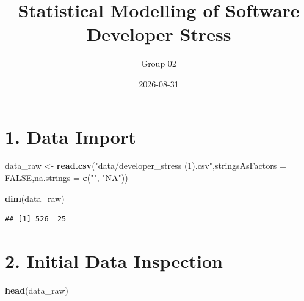 \documentclass[
]{article}
\title{Statistical Modelling of Software Developer Stress}
\author{Group 02}
\date{2026-08-31}
\newenvironment{Shaded}{\begin{snugshade}}{\end{snugshade}}
\newcommand{\AttributeTok}[1]{\textcolor[rgb]{0.13,0.29,0.53}{#1}}
\newcommand{\ConstantTok}[1]{\textcolor[rgb]{0.56,0.35,0.01}{#1}}
\newcommand{\FunctionTok}[1]{\textcolor[rgb]{0.13,0.29,0.53}{\textbf{#1}}}
\newcommand{\NormalTok}[1]{#1}
\newcommand{\OtherTok}[1]{\textcolor[rgb]{0.56,0.35,0.01}{#1}}
\newcommand{\StringTok}[1]{\textcolor[rgb]{0.31,0.60,0.02}{#1}}
\begin{document}
\maketitle

\section{1. Data Import}\label{data-import}

\begin{Shaded}
\begin{Highlighting}[]
\NormalTok{data\_raw }\OtherTok{\textless{}{-}} \FunctionTok{read.csv}\NormalTok{(}\StringTok{"data/developer\_stress (1).csv"}\NormalTok{,}\AttributeTok{stringsAsFactors =} \ConstantTok{FALSE}\NormalTok{,}\AttributeTok{na.strings =} \FunctionTok{c}\NormalTok{(}\StringTok{""}\NormalTok{, }\StringTok{"NA"}\NormalTok{))}
\end{Highlighting}
\end{Shaded}

\begin{Shaded}
\begin{Highlighting}[]
\FunctionTok{dim}\NormalTok{(data\_raw)}
\end{Highlighting}
\end{Shaded}

\begin{verbatim}
## [1] 526  25
\end{verbatim}

\section{2. Initial Data Inspection}\label{initial-data-inspection}

\begin{Shaded}
\begin{Highlighting}[]
\FunctionTok{head}\NormalTok{(data\_raw)}
\end{Highlighting}
\end{Shaded}
\end{document}
